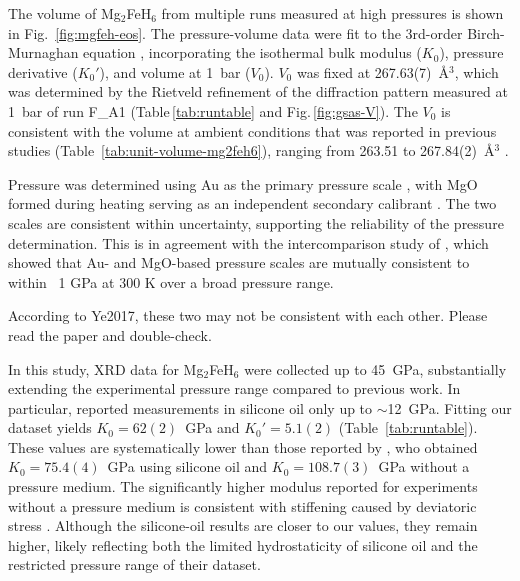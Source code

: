 \documentclass[draft,jgrga,12pt]{agujournal2019}
\begin{document}
The volume of Mg$_2$FeH$_6$ from multiple runs measured at high pressures is shown in Fig.~\ref{fig:mgfeh-eos}. 
The pressure-volume data were fit to {the} 3rd-order Birch-Murnaghan equation \cite{birch_elasticity_1952}, incorporating the isothermal bulk modulus ($K_0$), pressure derivative ($K_{0}'$), and volume at 1~bar ($V_0$). 
$V_0$ was fixed at 267.63(7)~\AA$^3$, which was determined by the Rietveld refinement of the diffraction pattern measured at 1~bar of run F\_A1 (Table\,\ref{tab:runtable} and Fig.\,\ref{fig:gsas-V}). 
The $V_0$ is consistent with the volume at ambient conditions that was reported in previous studies (Table~\ref{tab:unit-volume-mg2feh6}), ranging from 263.51 to 267.84(2)~\AA$^3$ \cite{george_bulk_2009, zhou_structural_2011, polanski_mg2feh6_2019, lang_insitu_2017, retuerto_neutron_2015, zareii_structural_2012, wang_preparation_2010, retuerto_highpressure_2010}. 


Pressure was determined using Au as the primary pressure scale \cite{fei_internally_2007}, with MgO formed during heating serving as an independent secondary calibrant \cite{dorogokupets_equations_2007}. 
The two scales are consistent within uncertainty, supporting the reliability of the pressure determination. 
This is in agreement with the intercomparison study of , which showed that Au- and MgO-based pressure scales are mutually consistent to within ~1 GPa at 300 K over a broad pressure range.
\begin{cbox}
According to Ye2017, these two may not be consistent with each other. Please read the paper and double-check. \\
\end{cbox}
In this study, XRD data for Mg$_2$FeH$_6$ were collected up to 45~{GPa}, substantially extending the experimental pressure range compared to previous work. 
In particular,  reported measurements in silicone oil only up to $\sim$12~{GPa}. 
Fitting our dataset yields $K_0 = 62(2)$~GPa and $K_0' = 5.1(2)$ (Table~\ref{tab:runtable}). 
These values are systematically lower than those reported by , who obtained $K_0 = 75.4(4)$~{GPa} using silicone oil and $K_0 = 108.7(3)$~{GPa} without a pressure medium. 
The significantly higher modulus reported for experiments without a pressure medium is consistent with stiffening caused by deviatoric stress \cite{mao_theory_2007}. 
Although the silicone-oil results are closer to our values, they remain higher, likely reflecting both the limited hydrostaticity of silicone oil and the restricted pressure range of their dataset.
\end{document}
